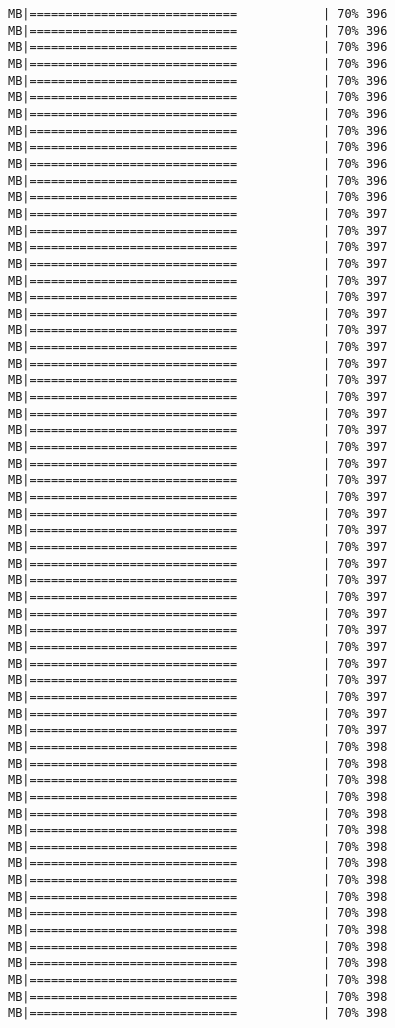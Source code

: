 \documentclass[
]{article}
\begin{document}
\begin{verbatim}
MB|=============================            | 70% 396 MB|=============================            | 70% 396 MB|=============================            | 70% 396 MB|=============================            | 70% 396 MB|=============================            | 70% 396 MB|=============================            | 70% 396 MB|=============================            | 70% 396 MB|=============================            | 70% 396 MB|=============================            | 70% 396 MB|=============================            | 70% 396 MB|=============================            | 70% 396 MB|=============================            | 70% 396 MB|=============================            | 70% 397 MB|=============================            | 70% 397 MB|=============================            | 70% 397 MB|=============================            | 70% 397 MB|=============================            | 70% 397 MB|=============================            | 70% 397 MB|=============================            | 70% 397 MB|=============================            | 70% 397 MB|=============================            | 70% 397 MB|=============================            | 70% 397 MB|=============================            | 70% 397 MB|=============================            | 70% 397 MB|=============================            | 70% 397 MB|=============================            | 70% 397 MB|=============================            | 70% 397 MB|=============================            | 70% 397 MB|=============================            | 70% 397 MB|=============================            | 70% 397 MB|=============================            | 70% 397 MB|=============================            | 70% 397 MB|=============================            | 70% 397 MB|=============================            | 70% 397 MB|=============================            | 70% 397 MB|=============================            | 70% 397 MB|=============================            | 70% 397 MB|=============================            | 70% 397 MB|=============================            | 70% 397 MB|=============================            | 70% 397 MB|=============================            | 70% 397 MB|=============================            | 70% 397 MB|=============================            | 70% 397 MB|=============================            | 70% 397 MB|=============================            | 70% 398 MB|=============================            | 70% 398 MB|=============================            | 70% 398 MB|=============================            | 70% 398 MB|=============================            | 70% 398 MB|=============================            | 70% 398 MB|=============================            | 70% 398 MB|=============================            | 70% 398 MB|=============================            | 70% 398 MB|=============================            | 70% 398 MB|=============================            | 70% 398 MB|=============================            | 70% 398 MB|=============================            | 70% 398 MB|=============================            | 70% 398 MB|=============================            | 70% 398 MB|=============================            | 70% 398 MB|=============================            | 70% 398 
\end{verbatim}
\end{document}

